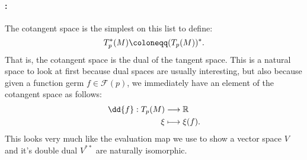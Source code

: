 \documentclass{homework}
\begin{document}
\paragraph{:} The cotangent space is the simplest on this list to define:
\begin{equation*}
	T_p^*(M) \defeq (T_p(M))^*.
\end{equation*}
That is, the cotangent space is the dual of the tangent space.
This is a natural space to look at first because dual spaces are usually interesting, but also because given a function germ $f\in \mathcal{F}(p)$, we immediately have an element of the cotangent space as follows:
\begin{align*}
	\dd{f}: T_p(M) & \longrightarrow \R  \\
	\xi            & \longmapsto \xi(f).
\end{align*}
This looks very much like the evaluation map we use to show a vector space $V$ and it's double dual $V^{**}$ are naturally isomorphic.
\end{document}
